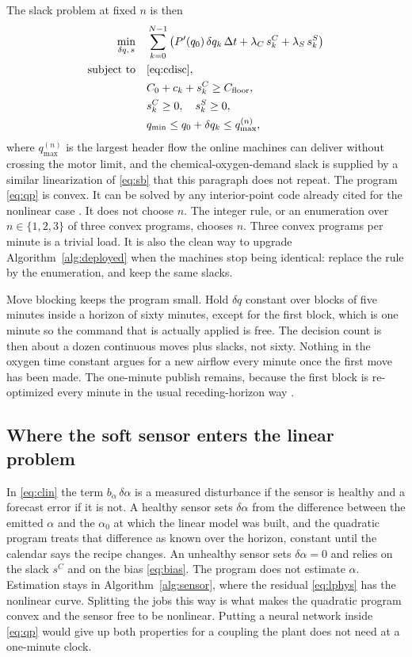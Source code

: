 The slack problem at fixed $n$ is then
\begin{equation}
\label{eq:qp}
\begin{aligned}
\min_{\delta q,\,s}
\quad
&
\sum_{k=0}^{N-1}
\left(
P'(q_{0})\,\delta q_{k}\,\Delta t
+
\lambda_{C}\,s^{C}_{k}
+
\lambda_{S}\,s^{S}_{k}
\right)
\\
\text{subject to}\quad
&
\eqref{eq:cdisc},
\\
&
C_{0}+c_{k}+s^{C}_{k}
\ge
C_{\mathrm{floor}},
\\
&
s^{C}_{k}\ge 0,
\quad
s^{S}_{k}\ge 0,
\\
&
q_{\min}
\le
q_{0}+\delta q_{k}
\le
q_{\max}^{(n)},
\end{aligned}
\end{equation}
where $q_{\max}^{(n)}$ is the largest header flow the online machines can deliver without crossing the motor limit, and the chemical-oxygen-demand slack is supplied by a similar linearization of \eqref{eq:sb} that this paragraph does not repeat. The program \eqref{eq:qp} is convex. It can be solved by any interior-point code already cited for the nonlinear case \cite{wachter2006ipopt,nocedal2006,boyd2004convex}. It does not choose $n$. The integer rule, or an enumeration over $n\in\{1,2,3\}$ of three convex programs, chooses $n$. Three convex programs per minute is a trivial load. It is also the clean way to upgrade Algorithm~\ref{alg:deployed} when the machines stop being identical: replace the rule by the enumeration, and keep the same slacks.

Move blocking keeps the program small. Hold $\delta q$ constant over blocks of five minutes inside a horizon of sixty minutes, except for the first block, which is one minute so the command that is actually applied is free. The decision count is then about a dozen continuous moves plus slacks, not sixty. Nothing in the oxygen time constant argues for a new airflow every minute once the first move has been made. The one-minute publish remains, because the first block is re-optimized every minute in the usual receding-horizon way \cite{mayne2000mpc,qin2003mpc}.

\subsection{Where the soft sensor enters the linear problem}

In \eqref{eq:clin} the term $b_{\alpha}\,\delta\alpha$ is a measured disturbance if the sensor is healthy and a forecast error if it is not. A healthy sensor sets $\delta\alpha$ from the difference between the emitted $\alpha$ and the $\alpha_{0}$ at which the linear model was built, and the quadratic program treats that difference as known over the horizon, constant until the calendar says the recipe changes. An unhealthy sensor sets $\delta\alpha=0$ and relies on the slack $s^{C}$ and on the bias \eqref{eq:bias}. The program does not estimate $\alpha$. Estimation stays in Algorithm~\ref{alg:sensor}, where the residual \eqref{eq:lphys} has the nonlinear curve. Splitting the jobs this way is what makes the quadratic program convex and the sensor free to be nonlinear. Putting a neural network inside \eqref{eq:qp} would give up both properties for a coupling the plant does not need at a one-minute clock.

